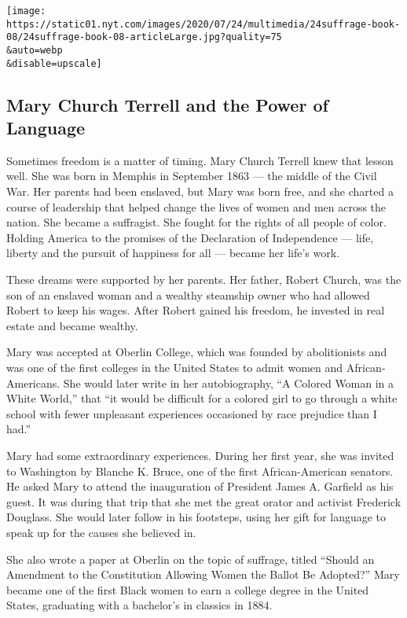 \texttt{[image: https://static01.nyt.com/images/2020/07/24/multimedia/24suffrage-book-08/24suffrage-book-08-articleLarge.jpg?quality=75\\\&auto=webp\\\&disable=upscale]}

\hypertarget{mary-church-terrell-and-the-power-of-language}{%
\subsection{Mary Church Terrell and the Power of
Language}\label{mary-church-terrell-and-the-power-of-language}}

Sometimes freedom is a matter of timing. Mary Church Terrell knew that
lesson well. She was born in Memphis in September 1863 --- the middle of
the Civil War. Her parents had been enslaved, but Mary was born free,
and she charted a course of leadership that helped change the lives of
women and men across the nation. She became a suffragist. She fought for
the rights of all people of color. Holding America to the promises of
the Declaration of Independence --- life, liberty and the pursuit of
happiness for all --- became her life's work.

These dreams were supported by her parents. Her father, Robert Church,
was the son of an enslaved woman and a wealthy steamship owner who had
allowed Robert to keep his wages. After Robert gained his freedom, he
invested in real estate and became wealthy.

Mary was accepted at Oberlin College, which was founded by abolitionists
and was one of the first colleges in the United States to admit women
and African-Americans. She would later write in her autobiography, ``A
Colored Woman in a White World,'' that ``it would be difficult for a
colored girl to go through a white school with fewer unpleasant
experiences occasioned by race prejudice than I had.''

Mary had some extraordinary experiences. During her first year, she was
invited to Washington by Blanche K. Bruce, one of the first
African-American senators. He asked Mary to attend the inauguration of
President James A. Garfield as his guest. It was during that trip that
she met the great orator and activist Frederick Douglass. She would
later follow in his footsteps, using her gift for language to speak up
for the causes she believed in.

She also wrote a paper at Oberlin on the topic of suffrage, titled
``Should an Amendment to the Constitution Allowing Women the Ballot Be
Adopted?'' Mary became one of the first Black women to earn a college
degree in the United States, graduating with a bachelor's in classics in
1884.

